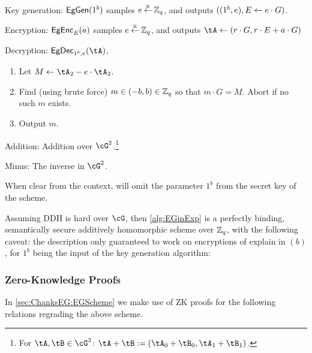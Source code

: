 \begin{algorithm}\label{alg:EGinExp}~
	
	
\item[Key generation:] $\mathsf{EgGen}(1^b)$ samples $e\mathbin{\stackrel{\mbox{\tiny R}}{\leftarrow}} {\mathbb Z}_q$, and outputs $((1^b,e),E\leftarrow  e\cdot G)$.
	
	\item[Encryption:] $\mathsf{EgEnc}_E(a)$  samples $e\mathbin{\stackrel{\mbox{\tiny R}}{\leftarrow}} {\mathbb Z}_q$, and outputs  $\tA \asn (r\cdot G, r\cdot E + a \cdot G)$
	
	
		\item[Decryption:] $\EgDec_{1^b,e}(\tA)$,   
		\begin{enumerate}
			\item 	Let $M \asn \tA_2 - e\cdot \tA_2$.
			
			\item Find (using brute force) $m\in (-b, b) \in {\mathbb Z}_q$ so that $m\cdot G = M$. Abort if no such $m$ exists.
			
			\item Output $m$.
		\end{enumerate}
		
		\item[Addition:] Addition over  $\cG^2$.\footnote{For $\tA,\tB \in \cG^2$: $\tA +\tB \eqdef (\tA_0+\tB_0,\tA_1+\tB_1)$.}
		
		\item[Minus:]  The inverse in $\cG^2$.
		
\end{algorithm}	
When clear from the context,  will omit the parameter $1^b$ from the secret key of the scheme.

\begin{theorem}\label{thm:EGinExp}
	Assuming DDH is hard over $\cG$, then \cref{alg:EGinExp} is  a perfectly binding,  semantically secure additively homomorphic scheme over ${\mathbb Z}_q$, with the following caveat:  the description only guaranteed to work on encryptions of explain in $(b)$,   for $1^b$ being the input of the key generation algorithm:
\end{theorem}



\subsubsection{Zero-Knowledge Proofs}
In \cref{sec:ChanksEG:EGScheme} we make use of ZK proofs for the following relations regrading the above scheme. 
	
